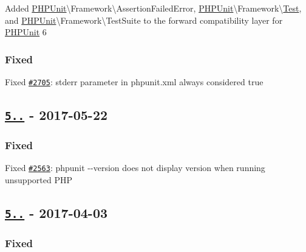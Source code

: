 \begin{DoxyItemize}
\item Added {\ttfamily \mbox{\hyperlink{namespace_p_h_p_unit}{P\+H\+P\+Unit}}\textbackslash{}Framework\textbackslash{}Assertion\+Failed\+Error}, {\ttfamily \mbox{\hyperlink{namespace_p_h_p_unit}{P\+H\+P\+Unit}}\textbackslash{}Framework\textbackslash{}\mbox{\hyperlink{class_test}{Test}}}, and {\ttfamily \mbox{\hyperlink{namespace_p_h_p_unit}{P\+H\+P\+Unit}}\textbackslash{}Framework\textbackslash{}Test\+Suite} to the forward compatibility layer for \mbox{\hyperlink{namespace_p_h_p_unit}{P\+H\+P\+Unit}} 6
\end{DoxyItemize}

\subsubsection*{Fixed}


\begin{DoxyItemize}
\item Fixed \href{https://github.com/sebastianbergmann/phpunit/issues/2705}{\tt \#2705}\+: {\ttfamily stderr} parameter in {\ttfamily phpunit.\+xml} always considered {\ttfamily true}
\end{DoxyItemize}

\subsection*{\href{https://github.com/sebastianbergmann/phpunit/compare/5.7.19...5.7.20}{\tt 5..} -\/ 2017-\/05-\/22}

\subsubsection*{Fixed}


\begin{DoxyItemize}
\item Fixed \href{https://github.com/sebastianbergmann/phpunit/pull/2563}{\tt \#2563}\+: {\ttfamily phpunit -\/-\/version} does not display version when running unsupported P\+HP
\end{DoxyItemize}

\subsection*{\href{https://github.com/sebastianbergmann/phpunit/compare/5.7.18...5.7.19}{\tt 5..} -\/ 2017-\/04-\/03}

\subsubsection*{Fixed}


